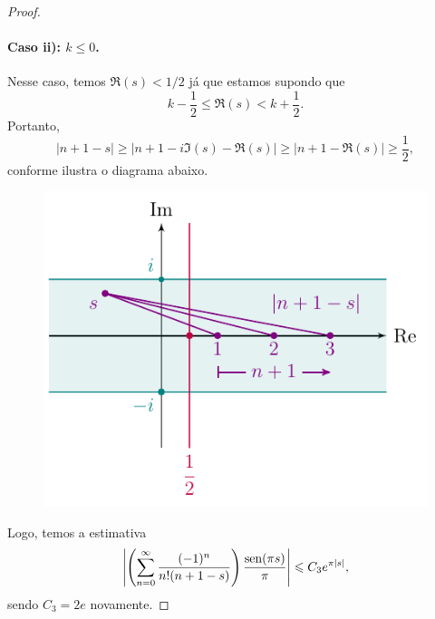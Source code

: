 \begin{proof}
        \paragraph{Caso ii): $k\leq 0$.} Nesse caso, temos $\Re(s) < 1/2$ já que estamos
        supondo que 
        \[
        k - \frac{1}{2} \leq \Re(s) < k + \frac{1}{2}.
        \]
        Portanto,
        \[
        |n+1-s| \geq |n+1 - i\Im(s) - \Re(s)| \geq |n+1 - \Re(s)| \geq \frac{1}{2},
        \]
        conforme ilustra o diagrama abaixo. 
        \begin{figure}[H]\centering
            \includegraphics{Figuras/K<=0.pdf}
        \end{figure}
        Logo, temos a estimativa
        \[
        \left|\left(\sum_{n=0}^{\infty} \frac{(-1)^n}{n!(n+1-s)}\right)\frac{\operatorname{sen}(\pi s)}{\pi}\right|
        \leqslant C_3e^{\pi |s|},
        \]
        sendo $C_3 = 2e$ novamente.
        

\end{proof}
